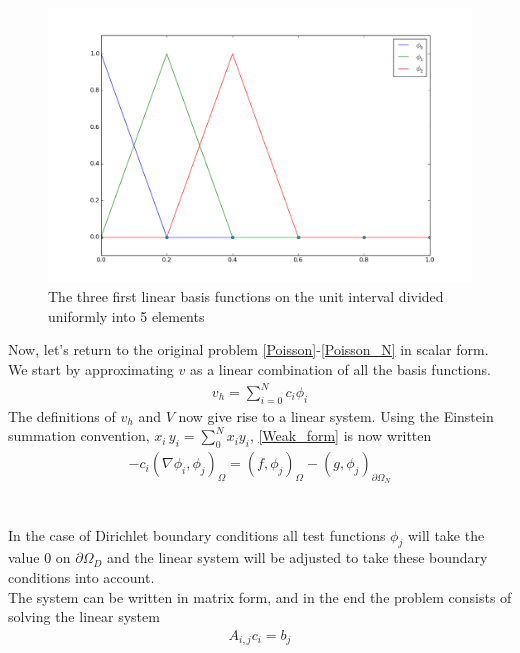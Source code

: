 \begin{figure}
  \begin{center}
    \includegraphics[scale=0.4]{figures/hats.png}
  \end{center}
	\caption{The three first linear basis functions on the unit interval divided uniformly into 5 elements}
	\label{fig:Hats}
\end{figure}
Now, let's return to the original problem \eqref{Poisson}-\eqref{Poisson_N} in scalar form. We start by approximating $v$ as a linear combination of all the basis functions. 
\begin{align}
v_h = \sum_{i=0}^N c_i \phi_i \label{u_hsum}
\end{align}
The definitions of $v_h$ and $V$ now give rise to a linear system. Using the Einstein summation convention, $x_i\,y_i = \sum_0^N x_i y_i $, \eqref{Weak_form} is now written 
\begin{align}
-c_i(\nabla \phi_i, \phi_j)_\Omega = (f,\phi_j)_\Omega - (g, \phi_j)_{\partial \Omega_N} \label{Linear_system}
\end{align}
\\
\\

In the case of Dirichlet boundary conditions all test functions $\phi_j$ will take the value 0 on $\partial \Omega_D$ and the linear system will be adjusted to take these boundary conditions into account. \\
The system can be written in matrix form, and in the end the problem consists of solving the linear system
\begin{align} A_{i,j}c_i = b_j \label{Matrix_1} \end{align}
\\
\\
